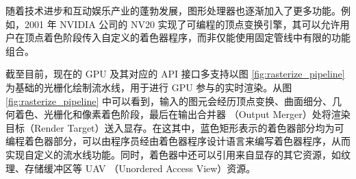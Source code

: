 随着技术进步和互动娱乐产业的蓬勃发展，图形处理器也逐渐加入了更多功能。例如，2001 年 NVIDIA 公司的 NV20 实现了可编程的顶点变换引擎\cite{10.1145/383259.383274}，其可以允许用户在顶点着色阶段传入自定义的着色器程序，而非仅能使用固定管线中有限的功能组合。

截至目前，现在的 GPU 及其对应的 API 接口多支持以图 \ref{fig:rasterize_pipeline} 为基础的光栅化绘制流水线，用于进行 GPU 参与的实时渲染。从图 \ref{fig:rasterize_pipeline} 中可以看到，输入的图元会经历顶点变换、曲面细分、几何着色、光栅化和像素着色阶段，最后在输出合并器 （Output Merger）处将渲染目标（Render Target）送入显存。在这其中，蓝色矩形表示的着色器部分均为可编程着色器部分，可以由程序员经由着色器程序设计语言来编写着色器程序，从而实现自定义的流水线功能。同时，着色器中还可以引用来自显存的其它资源，如纹理、存储缓冲区等 UAV （Unordered Access View）资源。








